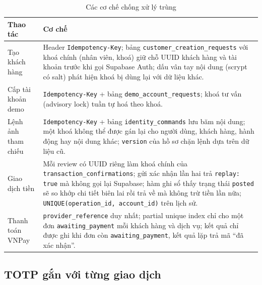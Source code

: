 \begin{table}[H]
\centering
\small
\caption{Các cơ chế chống xử lý trùng}
\label{tab:ch2-idempotency}
\begin{tabularx}{\textwidth}{>{\raggedright\arraybackslash}p{}X}
\toprule
\textbf{Thao tác} & \textbf{Cơ chế} \\
\midrule
Tạo khách hàng & Header \texttt{Idempotency-\allowbreak{}Key}; bảng \texttt{customer\_\allowbreak{}creation\_\allowbreak{}requests} với khoá chính (nhân viên, khoá) giữ chỗ UUID khách hàng và tài khoản trước khi gọi Supabase Auth; dấu vân tay nội dung (scrypt có salt) phát hiện khoá bị dùng lại với dữ liệu khác. \\
Cấp tài khoản demo & \texttt{Idempotency-\allowbreak{}Key} + bảng \texttt{demo\_\allowbreak{}account\_\allowbreak{}requests}; khoá tư vấn (advisory lock) tuần tự hoá theo khoá. \\
Lệnh ảnh tham chiếu & \texttt{Idempotency-\allowbreak{}Key} + bảng \texttt{identity\_\allowbreak{}commands} lưu băm nội dung; một khoá không thể được gán lại cho người dùng, khách hàng, hành động hay nội dung khác; \texttt{version} của hồ sơ chặn lệnh dựa trên dữ liệu cũ. \\
Giao dịch tiền & Mỗi review có UUID riêng làm khoá chính của \texttt{transaction\_\allowbreak{}confirmations}; gửi xác nhận lần hai trả \texttt{replay: true} mà không gọi lại Supabase; hàm ghi sổ thấy trạng thái \texttt{posted} sẽ so khớp chi tiết biên lai rồi trả về mà không trừ tiền lần nữa; \texttt{UNIQUE(operation\_\allowbreak{}id, account\_\allowbreak{}id)} trên lịch sử. \\
Thanh toán VNPay & \texttt{provider\_\allowbreak{}reference} duy nhất; partial unique index chỉ cho một đơn \texttt{awaiting\_\allowbreak{}payment} mỗi khách hàng và dịch vụ; kết quả chỉ được ghi khi đơn còn \texttt{awaiting\_\allowbreak{}payment}, kết quả lặp trả mã ``đã xác nhận''. \\
\bottomrule
\end{tabularx}
\end{table}

\subsection{TOTP gắn với từng giao dịch}
\label{sec:ch2-totp}


